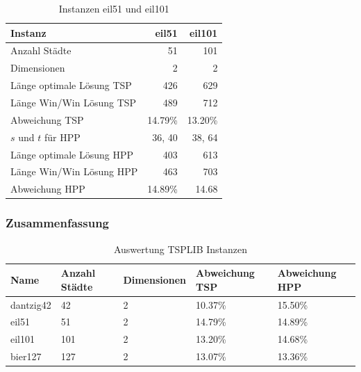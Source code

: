 \documentclass[11pt,a4paper]{article}
\begin{document}
\begin{table}[H]
        \centering
        \begin{tabular}{| l | r | r |}
            \hline
                Instanz                     & \textbf{eil51}
                                            & \textbf{eil101} \\ \hline
                Anzahl Städte               & 51        & 101       \\ \hline
                Dimensionen                 & 2         & 2         \\ \hline
                Länge optimale Lösung TSP   & 426       & 629       \\ \hline
                Länge Win/Win Lösung  TSP   & 489       & 712       \\ \hline
                Abweichung TSP              & 14.79\%   & 13.20\%   \\ \hline
                $s$ und $t$ für HPP         & 36, 40    & 38, 64    \\ \hline
                Länge optimale Lösung HPP   & 403       & 613       \\ \hline
                Länge Win/Win Lösung  HPP   & 463       & 703       \\ \hline
                Abweichung HPP              & 14.89\%   & 14.68     \\ \hline
        \end{tabular}
        \caption{Instanzen eil51 und eil101}
        \label{tab:instanzen_eil}
\end{table}

\subsubsection{Zusammenfassung}
    \begin{table}[H]
                \centering
                \begin{tabular}{| p{2.0cm} | p{2.0cm} | p{2.5cm} | p{2.5cm} | p{2.5cm} |}
                    \hline
                    \small{\textbf{Name}} &
                    \small{\textbf{Anzahl Städte}}  & 
                    \small{\textbf{Dimensionen}} & 
                    \small{\textbf{Abweichung TSP}} & 
                    \small{\textbf{Abweichung HPP}} \\ \hline

                    dantzig42   & 42    & 2     & 10.37\%   & 15.50\%   \\ \hline
                    eil51       & 51    & 2     & 14.79\%   & 14.89\%   \\ \hline
                    eil101      & 101   & 2     & 13.20\%   & 14.68\%   \\ \hline
                    bier127     & 127   & 2     & 13.07\%   & 13.36\%   \\ \hline
               \end{tabular}
                \caption{Auswertung TSPLIB Instanzen}
                \label{tab:instanz_tsplib_instanzen}
        \end{table}
\end{document}
